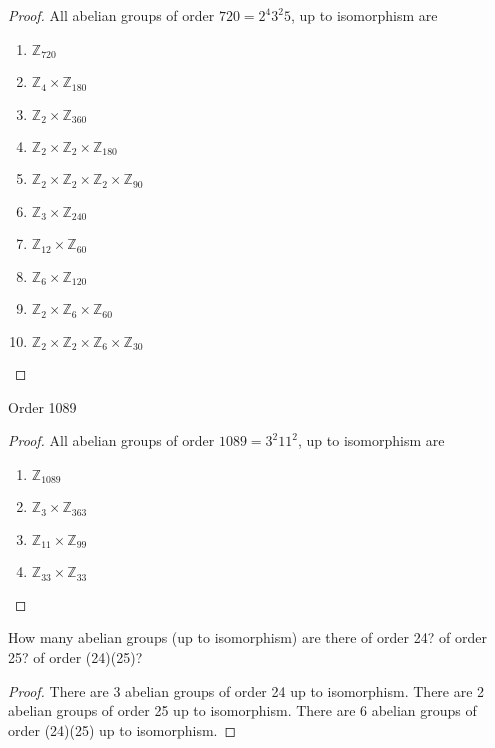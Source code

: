\begin{proof}
    All abelian groups of order $720 = 2^{4}3^{2}5$, up to isomorphism are
    \begin{enumerate}
        \item $\mathbb{Z}_{720}$
        \item $\mathbb{Z}_{4} \times \mathbb{Z}_{180}$
        \item $\mathbb{Z}_{2} \times \mathbb{Z}_{360}$
        \item $\mathbb{Z}_{2} \times \mathbb{Z}_{2} \times \mathbb{Z}_{180}$
        \item $\mathbb{Z}_{2} \times \mathbb{Z}_{2} \times \mathbb{Z}_{2} \times \mathbb{Z}_{90}$
        \item $\mathbb{Z}_{3} \times \mathbb{Z}_{240}$
        \item $\mathbb{Z}_{12} \times \mathbb{Z}_{60}$
        \item $\mathbb{Z}_{6} \times \mathbb{Z}_{120}$
        \item $\mathbb{Z}_{2} \times \mathbb{Z}_{6} \times \mathbb{Z}_{60}$
        \item $\mathbb{Z}_{2} \times \mathbb{Z}_{2} \times \mathbb{Z}_{6} \times \mathbb{Z}_{30}$
    \end{enumerate}
\end{proof}

\newpage
\begin{exercise}
    Order 1089
\end{exercise}

\begin{proof}
    All abelian groups of order $1089 = 3^{2}11^{2}$, up to isomorphism are
    \begin{enumerate}
        \item $\mathbb{Z}_{1089}$
        \item $\mathbb{Z}_{3} \times \mathbb{Z}_{363}$
        \item $\mathbb{Z}_{11} \times \mathbb{Z}_{99}$
        \item $\mathbb{Z}_{33} \times \mathbb{Z}_{33}$
    \end{enumerate}
\end{proof}

\newpage
\begin{exercise}
    How many abelian groups (up to isomorphism) are there of order 24? of order 25? of order (24)\@(25)?
\end{exercise}

\begin{proof}
    There are 3 abelian groups of order 24 up to isomorphism. There are 2 abelian groups of order 25 up to isomorphism. There are 6 abelian groups of order (24)\@(25) up to isomorphism.
\end{proof}

